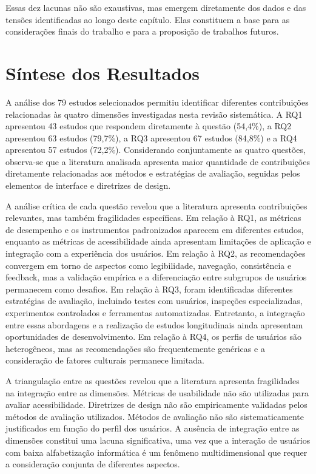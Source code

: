 Essas dez lacunas não são exaustivas, mas emergem diretamente dos dados e das tensões identificadas ao longo deste capítulo. Elas constituem a base para as considerações finais do trabalho e para a proposição de trabalhos futuros.


\section{Síntese dos Resultados}

A análise dos 79 estudos selecionados permitiu identificar diferentes contribuições relacionadas às quatro dimensões investigadas nesta revisão sistemática. A RQ1 apresentou 43 estudos que respondem diretamente à questão (54,4\%), a RQ2 apresentou 63 estudos (79,7\%), a RQ3 apresentou 67 estudos (84,8\%) e a RQ4 apresentou 57 estudos (72,2\%). Considerando conjuntamente as quatro questões, observa-se que a literatura analisada apresenta maior quantidade de contribuições diretamente relacionadas aos métodos e estratégias de avaliação, seguidas pelos elementos de interface e diretrizes de design.

A análise crítica de cada questão revelou que a literatura apresenta contribuições relevantes, mas também fragilidades específicas. Em relação à RQ1, as métricas de desempenho e os instrumentos padronizados aparecem em diferentes estudos, enquanto as métricas de acessibilidade ainda apresentam limitações de aplicação e integração com a experiência dos usuários. Em relação à RQ2, as recomendações convergem em torno de aspectos como legibilidade, navegação, consistência e feedback, mas a validação empírica e a diferenciação entre subgrupos de usuários permanecem como desafios. Em relação à RQ3, foram identificadas diferentes estratégias de avaliação, incluindo testes com usuários, inspeções especializadas, experimentos controlados e ferramentas automatizadas. Entretanto, a integração entre essas abordagens e a realização de estudos longitudinais ainda apresentam oportunidades de desenvolvimento. Em relação à RQ4, os perfis de usuários são heterogêneos, mas as recomendações são frequentemente genéricas e a consideração de fatores culturais permanece limitada.

A triangulação entre as questões revelou que a literatura apresenta fragilidades na integração entre as dimensões. Métricas de usabilidade não são utilizadas para avaliar acessibilidade. Diretrizes de design não são empiricamente validadas pelos métodos de avaliação utilizados. Métodos de avaliação não são sistematicamente justificados em função do perfil dos usuários. A ausência de integração entre as dimensões constitui uma lacuna significativa, uma vez que a interação de usuários com baixa alfabetização informática é um fenômeno multidimensional que requer a consideração conjunta de diferentes aspectos.

